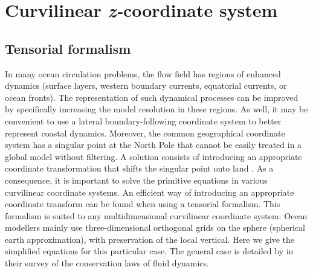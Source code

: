 \documentclass[../main/NEMO_manual]{subfiles}
\begin{document}
\section{Curvilinear \textit{z-}coordinate system}
\label{sec:PE_zco}


\subsection{Tensorial formalism}
\label{subsec:PE_tensorial}

In many ocean circulation problems, the flow field has regions of enhanced dynamics
(\ie surface layers, western boundary currents, equatorial currents, or ocean fronts).
The representation of such dynamical processes can be improved by
specifically increasing the model resolution in these regions.
As well, it may be convenient to use a lateral boundary-following coordinate system to
better represent coastal dynamics.
Moreover, the common geographical coordinate system has a singular point at the North Pole that
cannot be easily treated in a global model without filtering.
A solution consists of introducing an appropriate coordinate transformation that
shifts the singular point onto land \citep{Madec_Imbard_CD96, Murray_JCP96}.
As a consequence, it is important to solve the primitive equations in various curvilinear coordinate systems.
An efficient way of introducing an appropriate coordinate transform can be found when using a tensorial formalism.
This formalism is suited to any multidimensional curvilinear coordinate system.
Ocean modellers mainly use three-dimensional orthogonal grids on the sphere (spherical earth approximation),
with preservation of the local vertical. Here we give the simplified equations for this particular case.
The general case is detailed by \citet{Eiseman1980} in their survey of the conservation laws of fluid dynamics.
\end{document}
